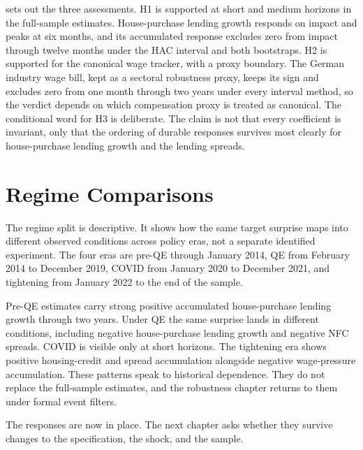  sets out the three assessments. H1 is supported at short and medium horizons in the full-sample estimates. House-purchase lending growth responds on impact and peaks at six months, and its accumulated response excludes zero from impact through twelve months under the HAC interval and both bootstraps. H2 is supported for the canonical wage tracker, with a proxy boundary. The German industry wage bill, kept as a sectoral robustness proxy, keeps its sign and excludes zero from one month through two years under every interval method, so the verdict depends on which compensation proxy is treated as canonical. The conditional word for H3 is deliberate. The claim is not that every coefficient is invariant, only that the ordering of durable responses survives most clearly for house-purchase lending growth and the lending spreads.



\section{Regime Comparisons}

The regime split is descriptive. It shows how the same target surprise maps into different observed conditions across policy eras, not a separate identified experiment. The four eras are pre-QE through January 2014, QE from February 2014 to December 2019, COVID from January 2020 to December 2021, and tightening from January 2022 to the end of the sample.

Pre-QE estimates carry strong positive accumulated house-purchase lending growth through two years. Under QE the same surprise lands in different conditions, including negative house-purchase lending growth and negative NFC spreads. COVID is visible only at short horizons. The tightening era shows positive housing-credit and spread accumulation alongside negative wage-pressure accumulation. These patterns speak to historical dependence. They do not replace the full-sample estimates, and the robustness chapter returns to them under formal event filters.

The responses are now in place. The next chapter asks whether they survive changes to the specification, the shock, and the sample.
